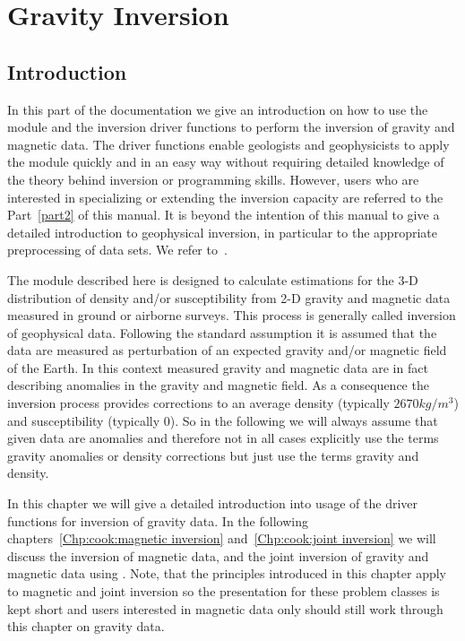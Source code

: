 \chapter{Gravity Inversion}\label{Chp:cook:gravity inversion}

\section{Introduction}

In this part of the documentation we give an introduction on how to use the
\downunder module and the inversion driver functions to perform the inversion
of gravity and magnetic data.
The driver functions enable geologists and geophysicists to apply the
\downunder module quickly and in an easy way without requiring detailed
knowledge of the theory behind inversion or programming skills.
However, users who are interested in specializing or extending the inversion
capacity are referred to the Part~\ref{part2} of this manual.
It is beyond the intention of this manual to give a detailed introduction to
geophysical inversion, in particular to the appropriate preprocessing of data
sets. We refer to~\cite{REF1, REF2, REF3}.

The \downunder module described here is designed to calculate estimations for
the 3-D distribution of density and/or susceptibility from 2-D gravity and
magnetic data measured in ground or airborne surveys.
This process is generally called inversion of geophysical data.
Following the standard assumption it is assumed that the data are measured as
perturbation of an expected gravity and/or magnetic field of the Earth.
In this context measured gravity and magnetic data are in fact describing
anomalies in the gravity and magnetic field.
As a consequence the inversion process provides corrections to an average
density (typically $2670 kg/m^3$) and susceptibility (typically $0$).
So in the following we will always assume that given data are anomalies and
therefore not in all cases explicitly use the terms gravity anomalies or
density corrections but just use the terms gravity and density.

In this chapter we will give a detailed introduction into usage of the driver
functions for inversion of gravity data.
In the following chapters~\ref{Chp:cook:magnetic inversion} and~\ref{Chp:cook:joint inversion}
we will discuss the inversion of magnetic data, and the joint inversion of
gravity and magnetic data using \downunder.
Note, that the principles introduced in this chapter apply to magnetic and
joint inversion so the presentation for these problem classes is kept short
and users interested in magnetic data only should still work through this
chapter on gravity data. 

